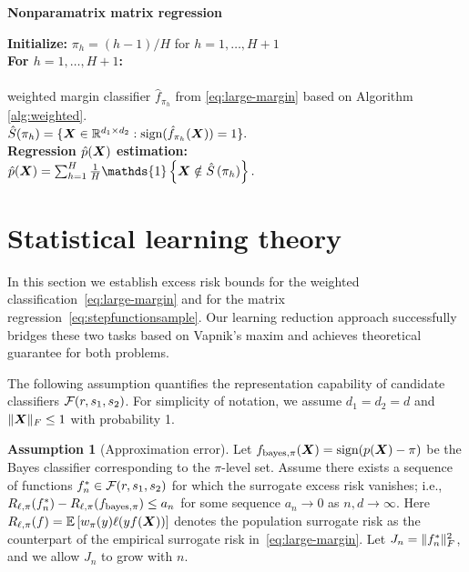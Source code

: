 \documentclass[11pt]{article}
\theoremstyle{plain}
\theoremstyle{definition}
\newtheorem{assumption}{Assumption}
\def\sign{\textup{sign}}
\def\bayespif{f_{\textup{bayes},\pi}}
\begin{document}
 \begin{algorithm}[h!]
     \caption{{\bf Nonparamatrix matrix regression} } \label{alg:regest}
{\bf Initialize:} $\pi_h = (h-1)/H$ for $h = 1, \ldots, H+1$\\
{\bf For $h = 1,\ldots, H+1$:}\\
\hspace*{.5cm}{\bf Level set $\hat S(\pi_h)$ estimation:}\\
\hspace*{1cm}{\bf Train} weighted margin classifier $\hat f_{\pi_h}$ from \eqref{eq:large-margin} based on Algorithm \ref{alg:weighted}.
\\[.1cm]
\hspace*{.9cm} $\hat S(\pi_h) = \{\bm X\in\mathbb{R}^{d_1\times d_2}:\text{sign}(\hat f_{\pi_h}(\bm X)) = 1\}.$
\\[.1cm]
{\bf Regression $\hat p(\bm X)$ estimation:} \\[.1cm]
\hspace*{.4cm} $\hat p(\mX) = \sum_{h=1}^H\frac{1}{H}\mathds{1}\left\{\mX\notin\hat S\left(\pi_h\right)\right\}.$\\[.1cm]
\end{algorithm}



\section{Statistical learning theory}
In this section we establish excess risk bounds for the weighted classification~\eqref{eq:large-margin} and for the matrix regression~\eqref{eq:stepfunctionsample}. Our learning reduction approach successfully bridges these two tasks based on Vapnik’s maxim and achieves theoretical guarantee for both problems. 


The following assumption quantifies the representation capability of candidate classifiers $\mathcal{F}(r,s_1,s_2)$. For simplicity of notation, we assume $d_1=d_2=d$ and $\lVert\bm X\rVert_F\leq 1$ with probability 1. 

\begin{assumption}[Approximation error]\label{ass:main} 
Let $f_{\text{bayes},\pi}(\mX)=\sign(p(\mX) -\pi)$ be the Bayes classifier corresponding to the $\pi$-level set. Assume there exists a sequence of functions $f_n^*\in\mathcal{F}(r,s_1,s_2)$ for which the surrogate excess risk vanishes; i.e., $R_{\ell,\pi}(f^*_n)-R_{\ell,\pi}(\bayespif)\leq a_n$ for some sequence $a_n\to 0$ as $n,d\to \infty$. Here $R_{\ell,\pi}(f)=\mathbb{E}\left[w_\pi(y)\ell(yf(\bm X))\right]$ denotes the population surrogate risk as the counterpart of the empirical surrogate risk in~\eqref{eq:large-margin}. Let $J_n=\lVert f^*_n\rVert_F^2$, and we allow $J_n$ to grow with $n$. 
\end{assumption}
\end{document}
